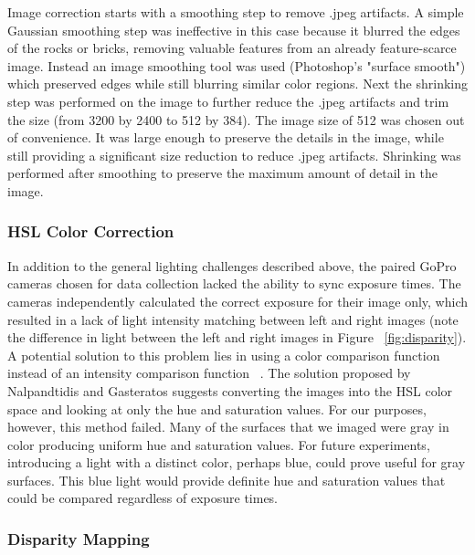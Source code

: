 \documentclass[twocolumn]{article}
\begin{document}
Image correction starts with a smoothing step  to remove .jpeg artifacts.
  A simple Gaussian smoothing step was ineffective in this case because it blurred the edges of the rocks or bricks, removing valuable features from an already feature-scarce image.
  Instead an image smoothing tool was used (Photoshop's "surface smooth") which preserved edges while still blurring similar color regions.
  Next the shrinking step was performed on the image to further reduce the .jpeg artifacts and trim the size (from 3200 by 2400 to 512 by 384).
The image size of 512 was chosen out of convenience.  It was large enough to preserve the details in the image, while still providing a significant size reduction to reduce .jpeg artifacts.   
Shrinking was performed after smoothing to preserve the maximum amount of detail in the image.

\subsubsection{HSL Color Correction}
\label{subsec:hsl_color_correction}
In addition to the general lighting challenges described above, the paired GoPro cameras chosen for data collection lacked the ability to sync exposure times.
The cameras independently calculated the correct exposure for their image only, which resulted in a lack of light intensity matching between left and right images (note the difference in light between the left and right images in Figure ~\ref{fig:disparity}).
A potential solution to this problem lies in using a color comparison function instead of an intensity comparison function ~\cite{stereo:nalGast}.
The solution proposed by Nalpandtidis and Gasteratos suggests converting the images into the HSL color space and looking at only the hue and saturation values.
For our purposes, however, this method failed.  
Many of the surfaces that we imaged were gray in color producing uniform hue and saturation values.
For future experiments, introducing a light with a distinct color, perhaps blue, could prove useful for gray surfaces.  
This blue light would provide definite hue and saturation values that could be compared regardless of exposure times.

\subsubsection{Disparity Mapping}
\label{subsec:disparity_mapping}
\end{document}
